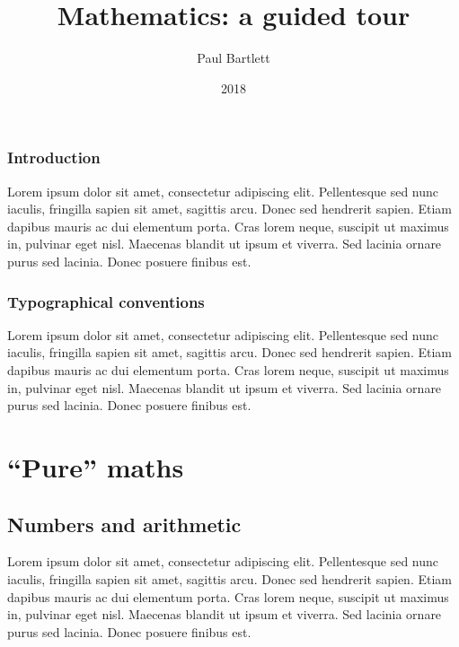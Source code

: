 \documentclass[a4paper,openany]{book}
\title{Mathematics: a guided tour}
\author{Paul Bartlett}
\date{2018}
\newcommand\lorem{
Lorem ipsum dolor sit amet, consectetur adipiscing elit. Pellentesque sed nunc iaculis,
fringilla sapien sit amet, sagittis arcu. Donec sed hendrerit sapien. Etiam dapibus mauris
ac dui elementum porta. Cras lorem neque, suscipit ut maximus in, pulvinar eget nisl.
Maecenas blandit ut ipsum et viverra. Sed lacinia ornare purus sed lacinia. Donec
posuere finibus est.
}
\begin{document}
\maketitle

\section*{Introduction}
\lorem

\section*{Typographical conventions}
\lorem

\part{``Pure'' maths}
\chapter{Numbers and arithmetic}
\lorem
\end{document}
